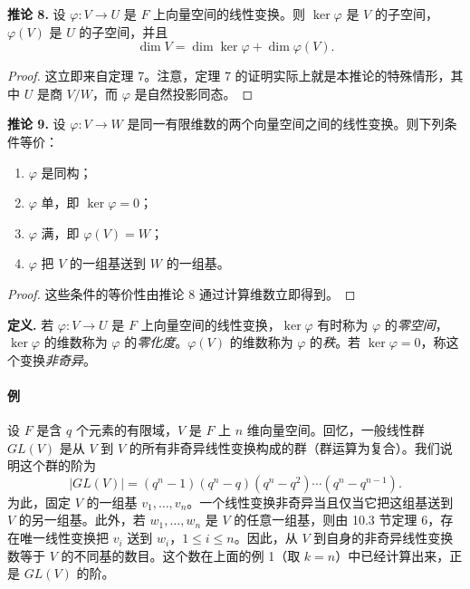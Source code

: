 \noindent\textbf{推论 8.} 设 $\varphi:V\to U$ 是 $F$ 上向量空间的线性变换。则 $\ker\varphi$ 是 $V$ 的子空间，$\varphi(V)$ 是 $U$ 的子空间，并且
\[
\dim V=\dim\ker\varphi+\dim\varphi(V).
\]

\begin{proof}
这立即来自定理 7。注意，定理 7 的证明实际上就是本推论的特殊情形，其中 $U$ 是商 $V/W$，而 $\varphi$ 是自然投影同态。
\end{proof}

\noindent\textbf{推论 9.} 设 $\varphi:V\to W$ 是同一有限维数的两个向量空间之间的线性变换。则下列条件等价：
\begin{enumerate}[label=(\arabic*)]
\item $\varphi$ 是同构；
\item $\varphi$ 单，即 $\ker\varphi=0$；
\item $\varphi$ 满，即 $\varphi(V)=W$；
\item $\varphi$ 把 $V$ 的一组基送到 $W$ 的一组基。
\end{enumerate}

\begin{proof}
这些条件的等价性由推论 8 通过计算维数立即得到。
\end{proof}

\noindent\textbf{定义.} 若 $\varphi:V\to U$ 是 $F$ 上向量空间的线性变换，$\ker\varphi$ 有时称为 $\varphi$ 的\emph{零空间}，$\ker\varphi$ 的维数称为 $\varphi$ 的\emph{零化度}。$\varphi(V)$ 的维数称为 $\varphi$ 的\emph{秩}。若 $\ker\varphi=0$，称这个变换\emph{非奇异}。

\paragraph{例}
设 $F$ 是含 $q$ 个元素的有限域，$V$ 是 $F$ 上 $n$ 维向量空间。回忆，一般线性群 $GL(V)$ 是从 $V$ 到 $V$ 的所有非奇异线性变换构成的群（群运算为复合）。我们说明这个群的阶为
\[
|GL(V)|=(q^n-1)(q^n-q)(q^n-q^2)\cdots(q^n-q^{n-1}).
\]
为此，固定 $V$ 的一组基 $v_1,\ldots,v_n$。一个线性变换非奇异当且仅当它把这组基送到 $V$ 的另一组基。此外，若 $w_1,\ldots,w_n$ 是 $V$ 的任意一组基，则由 10.3 节定理 6，存在唯一线性变换把 $v_i$ 送到 $w_i$，$1\leq i\leq n$。因此，从 $V$ 到自身的非奇异线性变换数等于 $V$ 的不同基的数目。这个数在上面的例 1（取 $k=n$）中已经计算出来，正是 $GL(V)$ 的阶。

